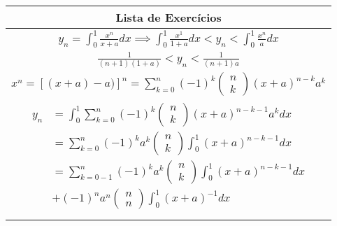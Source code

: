 \documentclass{article}
\begin{document}
\vspace{2em}
\begin{tabularx}{.5\textwidth}{c}
\toprule
Lista de Exercícios\\
\midrule
$ y_n = \int_0^1 \frac{x^n}{x+a} dx \implies \int_0^1 \frac{x^1}{1+a}dx < y_n < \int_0^1 \frac{x^n}{a}dx$\\
$ \frac{1}{(n+1)(1+a)} < y_n < \frac{1}{(n+1)a}$\\
$ x^n = [(x+a)-a)]^n = \displaystyle\sum_{k=0}^{n} (-1)^k \left( \begin{array}{c}
n\\
k
\end{array}
\right) (x+a)^{n-k}a^k$\\

$
\begin{aligned}
 y_n &= \displaystyle \int_0^1 \displaystyle \sum_{k=0}^{n} (-1)^k \left( \begin{array}{c}
n\\
k
\end{array}
\right) (x+a)^{n-k-1}a^k dx\\

&= \displaystyle \sum_{k=0}^{n} (-1)^k a^k \left( \begin{array}{c}
n\\
k
\end{array}
\right) \displaystyle \int_0^1 (x+a)^{n-k-1} dx\\

&= \displaystyle \sum_{k=0-1}^{n} (-1)^k a^k \left( \begin{array}{c}
n\\
k
\end{array}
\right) \displaystyle \int_0^1 (x+a)^{n-k-1} dx\\

&+ (-1)^n a^n \left( \begin{array}{c}
n\\
n
\end{array}
\right) \displaystyle \int_0^1 (x+a)^{-1}dx\\
\end{aligned}
$\\
\midrule
\end{tabularx}
\end{document}
